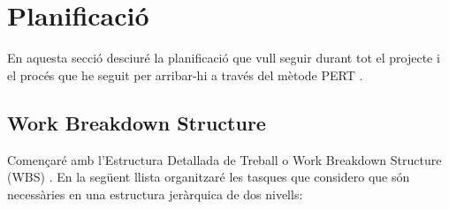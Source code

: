 \documentclass[10pt,a4paper,twocolumn,twoside]{article}
\begin{document}
\section{Planificació}

En aquesta secció desciuré la planificació que vull seguir durant tot el
projecte i el procés que he seguit per arribar-hi a través del mètode
PERT \cite{PERT}.

\subsection{Work Breakdown Structure}
Començaré amb l'Estructura Detallada de Treball o Work Breakdown Structure (WBS)
\cite{WBS}. En la següent llista organitzaré les tasques que considero que són 
necessàries en una estructura jeràrquica de dos nivells:
\end{document}
